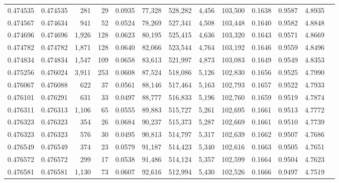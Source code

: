 \begin{tabular}{rrrrrrrrrrrrr}
0.474535 & 0.474535 &   281 &    29 &                                     0.0935 &  77,328 & 528,282 &   4,456 & 103,500 & 0.1638 & 0.9587 & 4.8935 \\
0.474567 & 0.474634 &   941 &    52 &                                     0.0524 &  78,269 & 527,341 &   4,508 & 103,448 & 0.1640 & 0.9582 & 4.8848 \\
0.474696 & 0.474696 & 1,926 &   128 &                                     0.0623 &  80,195 & 525,415 &   4,636 & 103,320 & 0.1643 & 0.9571 & 4.8669 \\
0.474782 & 0.474782 & 1,871 &   128 &                                     0.0640 &  82,066 & 523,544 &   4,764 & 103,192 & 0.1646 & 0.9559 & 4.8496 \\
0.474834 & 0.474834 & 1,547 &   109 &                                     0.0658 &  83,613 & 521,997 &   4,873 & 103,083 & 0.1649 & 0.9549 & 4.8353 \\
0.475256 & 0.476024 & 3,911 &   253 &                                     0.0608 &  87,524 & 518,086 &   5,126 & 102,830 & 0.1656 & 0.9525 & 4.7990 \\
0.476067 & 0.476088 &   622 &    37 &                                     0.0561 &  88,146 & 517,464 &   5,163 & 102,793 & 0.1657 & 0.9522 & 4.7933 \\
0.476101 & 0.476291 &   631 &    33 &                                     0.0497 &  88,777 & 516,833 &   5,196 & 102,760 & 0.1659 & 0.9519 & 4.7874 \\
0.476311 & 0.476313 & 1,106 &    65 &                                     0.0555 &  89,883 & 515,727 &   5,261 & 102,695 & 0.1661 & 0.9513 & 4.7772 \\
0.476323 & 0.476323 &   354 &    26 &                                     0.0684 &  90,237 & 515,373 &   5,287 & 102,669 & 0.1661 & 0.9510 & 4.7739 \\
0.476323 & 0.476323 &   576 &    30 &                                     0.0495 &  90,813 & 514,797 &   5,317 & 102,639 & 0.1662 & 0.9507 & 4.7686 \\
0.476549 & 0.476549 &   374 &    23 &                                     0.0579 &  91,187 & 514,423 &   5,340 & 102,616 & 0.1663 & 0.9505 & 4.7651 \\
0.476572 & 0.476572 &   299 &    17 &                                     0.0538 &  91,486 & 514,124 &   5,357 & 102,599 & 0.1664 & 0.9504 & 4.7623 \\
0.476581 & 0.476581 & 1,130 &    73 &                                     0.0607 &  92,616 & 512,994 &   5,430 & 102,526 & 0.1666 & 0.9497 & 4.7519 \\

\end{tabular}
